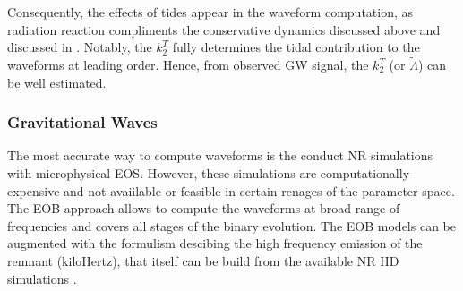 Consequently, the effects of tides appear in the waveform computation, as radiation reaction 
compliments the conservative dynamics discussed above \cite{Damour:2008gu} and discussed in \cite{Damour:2012yf,Banihashemi:2018xfb}.
%
%
Notably, the $k_2^T$ fully determines the tidal contribution to the waveforms at leading order. 
Hence, from observed \ac{GW} signal, the $k_2^T$ (or $\tilde{\Lambda}$) can be well estimated. 
%

\subsubsection{Gravitational Waves}

The most accurate way to compute waveforms is the conduct \ac{NR} simulations with microphysical 
\ac{EOS}. However, these simulations are computationally expensive and not avaiilable or feasible 
in certain renages of the parameter space.
The \ac{EOB} approach allows to compute the waveforms at broad range of frequencies and 
covers all stages of the binary evolution. 
The \ac{EOB} models can be augmented with the formulism descibing the 
high frequency emission of the remnant (kiloHertz), that itself can be build from the 
available \ac{NR} \ac{HD} simulations \cite{Bernuzzi:2015rla,Chatziioannou:2017ixj,Easter:2018pqy}.

